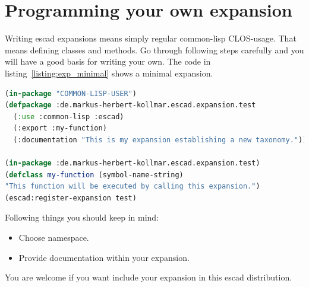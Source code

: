 \documentclass[a4paper, 12pt, openany]{scrbook}
\begin{document}
\section{Programming your own expansion}
Writing escad expansions means simply regular common-lisp CLOS-usage. That means defining classes and methods. Go through following steps carefully and you will have a good basis for writing your own. The code in listing~\ref{listing:exp_minimal} shows a minimal expansion.
\begin{lstlisting}[caption={Minimal expansion code of a taxonomy called ``test''.}, language=Lisp, morekeywords={in-package, use}, label=listing:exp_minimal]
(in-package "COMMON-LISP-USER")
(defpackage :de.markus-herbert-kollmar.escad.expansion.test
  (:use :common-lisp :escad)
  (:export :my-function)
  (:documentation "This is my expansion establishing a new taxonomy."))
  
(in-package :de.markus-herbert-kollmar.escad.expansion.test)
(defclass my-function (symbol-name-string)
"This function will be executed by calling this expansion.")
(escad:register-expansion test)
\end{lstlisting}
Following things you should keep in mind:
\begin{itemize}
\item Choose namespace.
\item Provide documentation within your expansion.
\end{itemize}
You are welcome if you want include your expansion in this escad distribution.

\clearpage %
\end{document}

